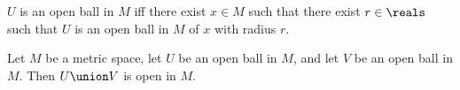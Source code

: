 \begin{abbreviation}\label{descriptive_syntax_for_openball2}
    $U$ is an open ball in $M$ iff there exist $x \in M$ such that there exist $r \in \reals$ such that $U$ is an open ball in $M$ of $x$ with radius $r$.
\end{abbreviation}

\begin{lemma}\label{union_of_open_balls_is_open}
    Let $M$ be a metric space, let $U$ be an open ball in $M$, and let
    $V$ be an open ball in $M$.
    Then $U \union V$ is open in $M$.
\end{lemma}






